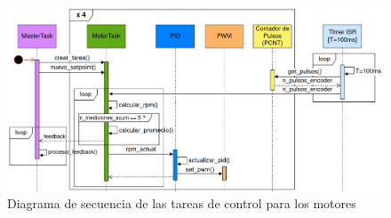 \begin{figure}[H]
    \centering
    \includegraphics[width=1.1\linewidth]{images/diag_secuencia_pid_solo.png}
    \caption{Diagrama de secuencia de las tareas de control para los motores}
    \label{fig:diagsecuenciapidsolo}
\end{figure}
